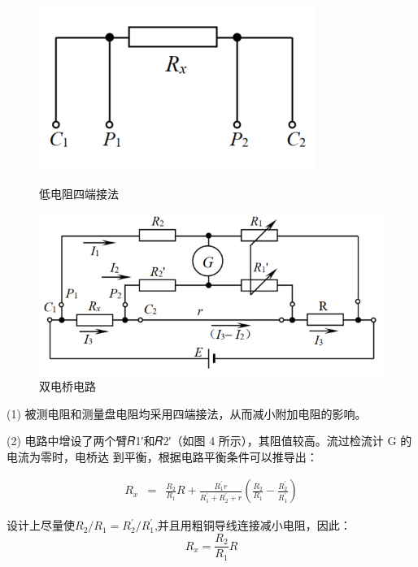 \documentclass[UTF8]{ctexart}
\begin{document}
    \begin{figure}[htbp]
        \begin{minipage}[t]{0.45\linewidth}
        \centering
        \includegraphics[scale=0.6]{低电阻四端接法.png}
        \caption{低电阻四端接法}
        \end{minipage}%
        \begin{minipage}[t]{0.45\linewidth}
        \centering
        \includegraphics[scale=0.6]{双电桥原理图.png}
        \caption{双电桥电路}
        \end{minipage}
    \end{figure}

    (1) 被测电阻和测量盘电阻均采用四端接法，从而减小附加电阻的影响。

    (2) 电路中增设了两个臂𝑅1′和𝑅2′（如图 4 所示），其阻值较高。流过检流计 G 的电流为零时，电桥达
    到平衡，根据电路平衡条件可以推导出：

    \begin{eqnarray}
        R_{x} & = & \frac{R_{2}}{R_{1}} R+\frac{R_{1}^{\prime} r}{R_{1}^{\prime}+R_{2}^{\prime}+r}\left(\frac{R_{2}}{R_{1}}-\frac{R_{2}^{\prime}}{R_{1}^{\prime}}\right)
    \end{eqnarray}

    设计上尽量使$R_{2} / R_{1}=R_{2}^{\prime} / R_{1}^{\prime}$,并且用粗铜导线连接减小电阻，因此：
    $$ R_{x}=\frac{R_{2}}{R_{1}} R$$
\end{document}

